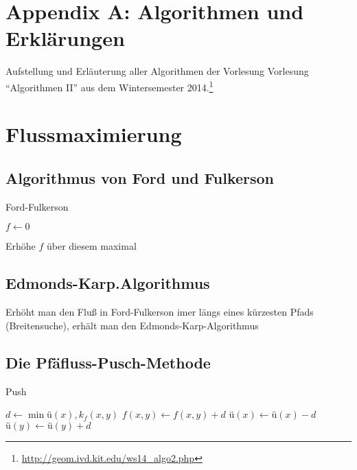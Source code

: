 \section{Appendix A: Algorithmen und Erklärungen}

Aufstellung und Erläuterung aller Algorithmen der Vorlesung Vorlesung "`Algorithmen II"' aus dem Wintersemester 2014.\footnote{\url{http://geom.ivd.kit.edu/ws14_algo2.php}}

\section{Flussmaximierung}

\subsection{Algorithmus von Ford und Fulkerson}

\begin{algorithm}[H]
	\caption{Ford-Fulkerson}

	\BlankLine

	$f \longleftarrow 0$

	 {
		Erhöhe $f$ über diesem maximal
	}
\end{algorithm}

\subsection{Edmonds-Karp.Algorithmus}
	Erhöht man den Fluß in Ford-Fulkerson imer längs eines kürzesten Pfads (Breitensuche), erhält man den Edmonds-Karp-Algorithmus
	
\subsection{Die Pfäfluss-Pusch-Methode}
\begin{algorithm}[H]
	\caption{Push}

	\Output{}
	\BlankLine

	$d \longleftarrow \min{ü(x), k_f(x,y)}$ \newline
	$f(x,y) \longleftarrow f(x,y) +d$ \newline
	$ü(x) \longleftarrow ü(x) -d $ \newline
	$ü(y) \longleftarrow ü(y) +d$ \newline
\end{algorithm}

